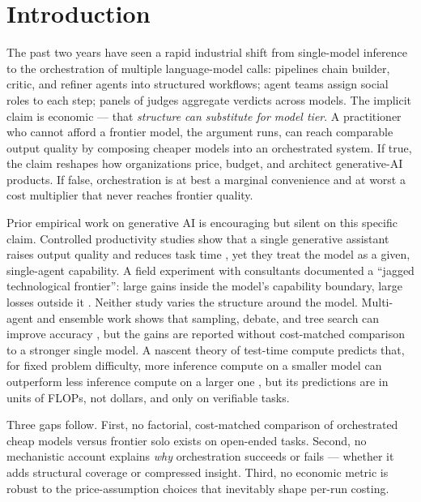 \documentclass[12pt,a4paper]{article}
\begin{document}
\section{Introduction}\label{sec:intro}

The past two years have seen a rapid industrial shift from single-model
inference to the orchestration of multiple language-model calls: pipelines
chain builder, critic, and refiner agents into structured workflows; agent
teams assign social roles to each step; panels of judges aggregate verdicts
across models. The implicit claim is economic --- that \emph{structure can
substitute for model tier}. A practitioner who cannot afford a frontier model,
the argument runs, can reach comparable output quality by composing cheaper
models into an orchestrated system. If true, the claim reshapes how
organizations price, budget, and architect generative-AI products. If false,
orchestration is at best a marginal convenience and at worst a cost multiplier
that never reaches frontier quality.

Prior empirical work on generative AI is encouraging but silent on this
specific claim. Controlled productivity studies show that a single generative
assistant raises output quality and reduces task time \citep{NoyZhang2023,
BrynjolfssonLiRaymond2023}, yet they treat the model as a given, single-agent
capability. A field experiment with consultants documented a ``jagged
technological frontier'': large gains inside the model's capability boundary,
large losses outside it \citep{DellAcquaEtAl2023}. Neither study varies the
structure around the model. Multi-agent and ensemble work shows that sampling,
debate, and tree search can improve accuracy \citep{WangEtAl2023,
LiangEtAl2024, YaoEtAl2023}, but the gains are reported without cost-matched
comparison to a stronger single model. A nascent theory of test-time compute
predicts that, for fixed problem difficulty, more inference compute on a
smaller model can outperform less inference compute on a larger one
\citep{SnellEtAl2024}, but its predictions are in units of FLOPs, not dollars,
and only on verifiable tasks.

Three gaps follow. First, no factorial, cost-matched comparison of orchestrated
cheap models versus frontier solo exists on open-ended tasks. Second, no
mechanistic account explains \emph{why} orchestration succeeds or fails ---
whether it adds structural coverage or compressed insight. Third, no economic
metric is robust to the price-assumption choices that inevitably shape per-run
costing.
\end{document}
